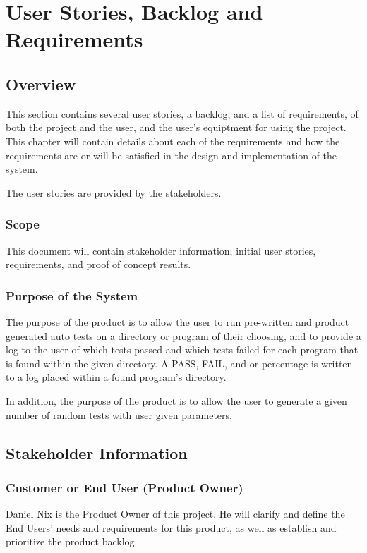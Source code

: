 \chapter{User Stories, Backlog and Requirements}
\section{Overview}
This section contains several user stories, a backlog, and a list of requirements, of
both the project and the user, and the user's equiptment for using the project. This
chapter will contain 
details about each of the requirements and how the requirements are or will be 
satisfied in the design and implementation of the system.

The user stories are provided by the stakeholders.

\subsection{Scope}

This document will contain stakeholder information, initial user stories, requirements, and 
proof of concept results.



\subsection{Purpose of the System}
The purpose of the product is to allow the user to run pre-written and product generated auto tests on a directory or 
program of their choosing, and to provide a log to the user of which tests passed and which tests failed for each program 
that is found within the given directory. A PASS, FAIL, and or percentage is written to a log placed within a found 
program's directory. 

In addition, the purpose of the product is to allow the user to generate a given number of random 
tests with user given parameters.

\section{ Stakeholder Information}


\subsection{Customer or End User (Product Owner)}
Daniel Nix is the Product Owner of this project.  He will clarify and define the End Users' needs and requirements 
for this product, as well as establish and prioritize the product backlog.

